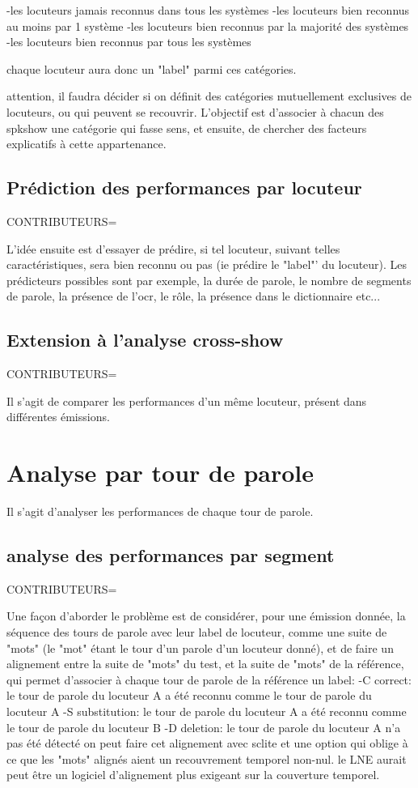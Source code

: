 \documentclass[utf8x]{article-hermes}
\begin{document}
-les locuteurs jamais reconnus dans tous les systèmes
-les locuteurs bien reconnus au moins par 1 système
-les locuteurs bien reconnus par la majorité des systèmes
-les locuteurs bien reconnus par tous les systèmes

chaque locuteur aura donc un "label" parmi ces catégories.

attention, il faudra décider si on définit des catégories mutuellement exclusives de locuteurs, ou qui peuvent se recouvrir.
L'objectif est d'associer à chacun des spkshow une catégorie qui fasse sens, et ensuite, de chercher des facteurs explicatifs à cette appartenance.

\subsection{Prédiction des performances par locuteur}
CONTRIBUTEURS=

L'idée ensuite est d'essayer de prédire, si tel locuteur, suivant telles caractéristiques, sera bien reconnu ou pas (ie prédire le "label"' du locuteur).
Les prédicteurs possibles sont par exemple, la durée de parole, le nombre de segments de parole, la présence de l'ocr, le rôle, la présence dans le dictionnaire etc...


\subsection{Extension à l'analyse cross-show}
CONTRIBUTEURS=

Il s'agit de comparer les performances d'un même locuteur, présent dans différentes émissions. 

\section{Analyse par tour de parole}
Il s'agit d'analyser les performances de chaque tour de parole.

\subsection{analyse des performances par segment}
CONTRIBUTEURS=

Une façon d'aborder le problème est de considérer, pour une émission donnée, la séquence des tours de parole avec leur label de locuteur, comme une suite de "mots" (le "mot" étant le tour d'un parole d'un locuteur donné), et de faire un alignement entre la suite de "mots" du test, et la suite de "mots" de la référence, qui permet d'associer à chaque tour de parole de la référence un label: 
-C correct: le tour de parole du locuteur A a été reconnu comme le tour de parole du locuteur A
-S substitution: le tour de parole du locuteur A a été reconnu comme le tour de parole du locuteur B
-D deletion: le tour de parole du locuteur A n'a pas été détecté
on peut faire cet alignement avec sclite et une option qui oblige à ce que les "mots" alignés aient un recouvrement temporel non-nul. le LNE aurait peut être un logiciel d'alignement plus exigeant sur la couverture temporel.
\end{document}
